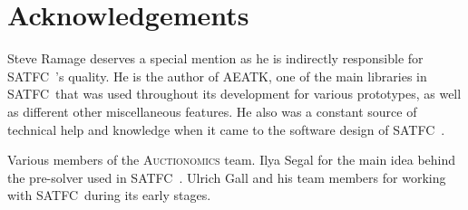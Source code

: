 \documentclass[
10pt, %
a4paper, %
oneside, %
headinclude,footinclude, %
BCOR5mm, %
]{scrartcl}
\newcommand{\SATFC}{\textsc{SATFC}~}
\newcommand{\AEATK}{\textsc{AEATK}}
\begin{document}
\section{Acknowledgements} 

Steve Ramage deserves a special mention as he is indirectly responsible for \SATFC's quality. He is the author of \AEATK, one of the main libraries in \SATFC that was used throughout its development for various prototypes, as well as different other miscellaneous features. He also was a constant source of technical help and knowledge when it came to the software design of \SATFC.

Various members of the \textsc{Auctionomics} team. Ilya Segal for the main idea behind the pre-solver used in \SATFC. Ulrich Gall and his team members for working with \SATFC during its early stages.
\end{document}
